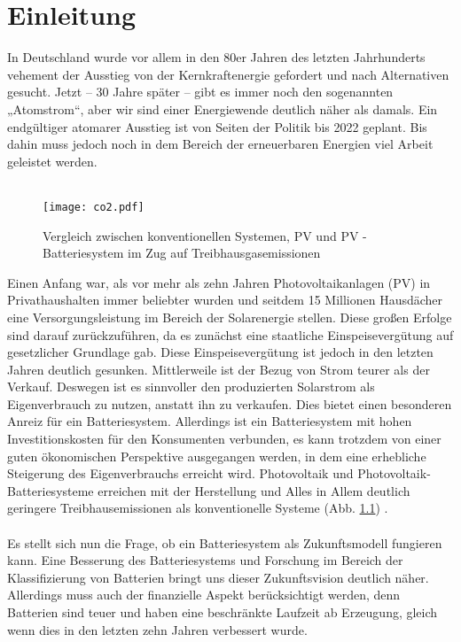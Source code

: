 \chapter{Einleitung}
In Deutschland wurde vor allem in den 80er Jahren des letzten Jahrhunderts vehement der Ausstieg von der Kernkraftenergie gefordert und nach Alternativen gesucht. Jetzt – 30 Jahre später – gibt es immer noch den sogenannten „Atomstrom“, aber wir sind einer Energiewende deutlich näher als damals. Ein endgültiger atomarer Ausstieg ist von Seiten der Politik bis 2022 geplant. Bis dahin muss jedoch noch in dem Bereich der erneuerbaren Energien viel Arbeit geleistet werden. \\\\
\begin{figure}[ht]
	\centering
  	\texttt{[image: co2.pdf]}
  	\caption{Vergleich zwischen konventionellen Systemen, PV und PV - Batteriesystem im Zug auf Treibhausgasemissionen \cite{Sievers2013}}
  	\label{fig:co2}
\end{figure}
Einen Anfang war, als vor mehr als zehn Jahren Photovoltaikanlagen (PV) in Privathaushalten immer beliebter wurden und seitdem 15 Millionen Hausdächer eine Versorgungsleistung im Bereich der Solarenergie stellen. Diese großen Erfolge sind darauf zurückzuführen, da es zunächst eine staatliche Einspeisevergütung auf gesetzlicher Grundlage gab. Diese Einspeisevergütung ist jedoch in den letzten Jahren deutlich gesunken. Mittlerweile ist der Bezug von Strom teurer als der Verkauf. Deswegen ist es sinnvoller den produzierten Solarstrom als Eigenverbrauch zu nutzen, anstatt ihn zu verkaufen. Dies bietet einen besonderen Anreiz für ein Batteriesystem. Allerdings ist ein Batteriesystem mit hohen Investitionskosten für den Konsumenten verbunden, es kann trotzdem von einer guten ökonomischen Perspektive ausgegangen werden, in dem eine erhebliche Steigerung des Eigenverbrauchs erreicht wird. Photovoltaik und Photovoltaik-Batteriesysteme erreichen mit der Herstellung und Alles in Allem deutlich geringere Treibhausemissionen als konventionelle Systeme (Abb. \ref{fig:co2}) \cite{Sievers2013}.\\\\
Es stellt sich nun die Frage, ob ein Batteriesystem als Zukunftsmodell fungieren kann. Eine Besserung des Batteriesystems und Forschung im Bereich der Klassifizierung von Batterien bringt uns dieser Zukunftsvision deutlich näher. Allerdings muss auch der finanzielle Aspekt berücksichtigt werden, denn Batterien sind teuer und haben eine beschränkte Laufzeit ab Erzeugung, gleich wenn dies in den letzten zehn Jahren verbessert wurde.

 

